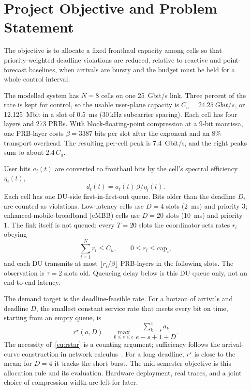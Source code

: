 \documentclass[11pt,a4paper]{article}
\begin{document}
\section{Project Objective and Problem Statement}

The objective is to allocate a fixed fronthaul capacity among cells so that priority-weighted deadline violations are reduced, relative to reactive and point-forecast baselines, when arrivals are bursty and the budget must be held for a whole control interval.

The modelled system has \(N=8\) cells on one 25~Gbit/s link. Three percent of the rate is kept for control, so the usable user-plane capacity is \(C_u=24.25~Gbit/s\), or 12.125~Mbit in a slot of 0.5~ms (30\,kHz subcarrier spacing). Each cell has four layers and 273 PRBs. With block-floating-point compression at a 9-bit mantissa, one PRB-layer costs \(\beta=3387\) bits per slot after the exponent and an 8\% transport overhead. The resulting per-cell peak is 7.4~Gbit/s, and the eight peaks sum to about \(2.4\,C_u\).

User bits \(a_i(t)\) are converted to fronthaul bits by the cell's spectral efficiency \(\eta_i(t)\),
\begin{equation}
d_i(t)=a_i(t)\,\beta/\eta_i(t).
\end{equation}
Each cell has one DU-side first-in-first-out queue. Bits older than the deadline \(D_i\) are counted as violations. Low-latency cells use \(D=4\) slots (2~ms) and priority \(3\); enhanced-mobile-broadband (eMBB) cells use \(D=20\) slots (10~ms) and priority \(1\). The link itself is not queued: every \(T=20\) slots the coordinator sets rates \(r_i\) obeying
\begin{equation}
\sum_{i=1}^{N} r_i \le C_u, \qquad 0\le r_i\le \mathrm{cap}_i,
\end{equation}
and each DU transmits at most \(\lfloor r_i/\beta\rfloor\) PRB-layers in the following slots. The observation is \(\tau=2\) slots old. Queueing delay below is this DU queue only, not an end-to-end latency.

The demand target is the deadline-feasible rate. For a horizon of arrivals and deadline \(D\), the smallest constant service rate that meets every bit on time, starting from an empty queue, is
\begin{equation}
r^{\star}(a,D)=\max_{0\le s\le e}\frac{\sum_{k=s}^{e}a_k}{e-s+1+D}.
\label{eq:rstar}
\end{equation}
The necessity of~\eqref{eq:rstar} is a counting argument; sufficiency follows the arrival-curve construction in network calculus~\cite{leboudec2001}. For a long deadline, \(r^{\star}\) is close to the mean; for \(D=4\) it tracks the short burst. The mid-semester objective is this allocation rule and its evaluation. Hardware deployment, real traces, and a joint choice of compression width are left for later.
\end{document}
